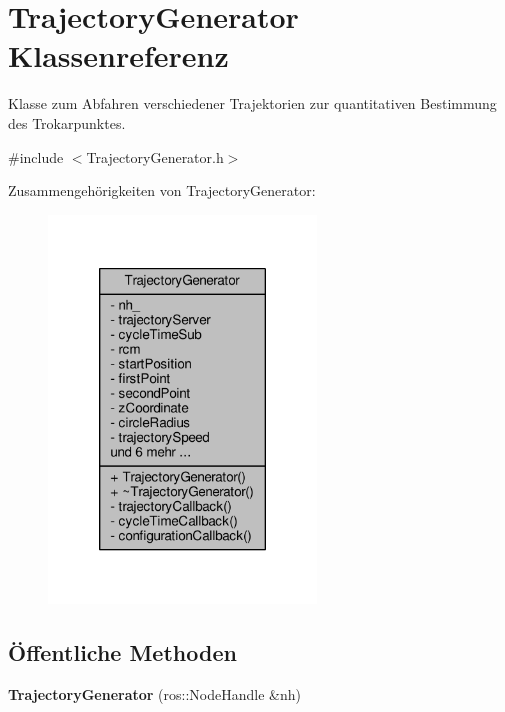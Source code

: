 \hypertarget{classTrajectoryGenerator}{\section{Trajectory\-Generator Klassenreferenz}
\label{classTrajectoryGenerator}
}


Klasse zum Abfahren verschiedener Trajektorien zur quantitativen Bestimmung des Trokarpunktes.  




{\ttfamily \#include $<$Trajectory\-Generator.\-h$>$}



Zusammengehörigkeiten von Trajectory\-Generator\-:
\nopagebreak
\begin{figure}[H]
\begin{center}
\leavevmode
\includegraphics[width=202pt]{classTrajectoryGenerator__coll__graph}
\end{center}
\end{figure}
\subsection*{Öffentliche Methoden}
\begin{DoxyCompactItemize}
\item 
\hypertarget{classTrajectoryGenerator_af630ce00841ce126cbeca7dabec2b571}{{\bfseries Trajectory\-Generator} (ros\-::\-Node\-Handle \&nh)}\label{classTrajectoryGenerator_af630ce00841ce126cbeca7dabec2b571}

\end{DoxyCompactItemize}
